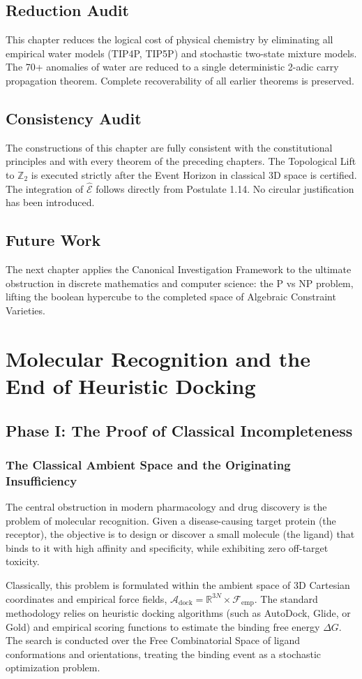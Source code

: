 \documentclass[11pt,openany]{extbook}
\newenvironment{reductionaudit}{\section*{Reduction Audit}}{}
\newenvironment{consistencyaudit}{\section*{Consistency Audit}}{}
\newenvironment{futurework}{\section*{Future Work}}{}
\theoremstyle{plain}
\theoremstyle{definition}
\begin{document}
\begin{reductionaudit}
\noindent This chapter reduces the logical cost of physical chemistry by eliminating all empirical water models (TIP4P, TIP5P) and stochastic two-state mixture models. The 70+ anomalies of water are reduced to a single deterministic 2-adic carry propagation theorem. Complete recoverability of all earlier theorems is preserved.
\end{reductionaudit}

\begin{consistencyaudit}
\noindent The constructions of this chapter are fully consistent with the constitutional principles and with every theorem of the preceding chapters. The Topological Lift to $\mathbb{Z}_2$ is executed strictly after the Event Horizon in classical 3D space is certified. The integration of $\hat{\mathcal{E}}$ follows directly from Postulate 1.14. No circular justification has been introduced.
\end{consistencyaudit}

\begin{futurework}
\noindent The next chapter applies the Canonical Investigation Framework to the ultimate obstruction in discrete mathematics and computer science: the P vs NP problem, lifting the boolean hypercube to the completed space of Algebraic Constraint Varieties.
\end{futurework}

\chapter{Molecular Recognition and the End of Heuristic Docking}

\section{Phase I: The Proof of Classical Incompleteness}

\subsection{The Classical Ambient Space and the Originating Insufficiency}
The central obstruction in modern pharmacology and drug discovery is the problem of molecular recognition. Given a disease-causing target protein (the receptor), the objective is to design or discover a small molecule (the ligand) that binds to it with high affinity and specificity, while exhibiting zero off-target toxicity.

Classically, this problem is formulated within the ambient space of 3D Cartesian coordinates and empirical force fields, $\mathcal{A}_{\text{dock}} = \mathbb{R}^{3N} \times \mathcal{F}_{\text{emp}}$. The standard methodology relies on heuristic docking algorithms (such as AutoDock, Glide, or Gold) and empirical scoring functions to estimate the binding free energy $\Delta G$. The search is conducted over the Free Combinatorial Space of ligand conformations and orientations, treating the binding event as a stochastic optimization problem.
\end{document}
